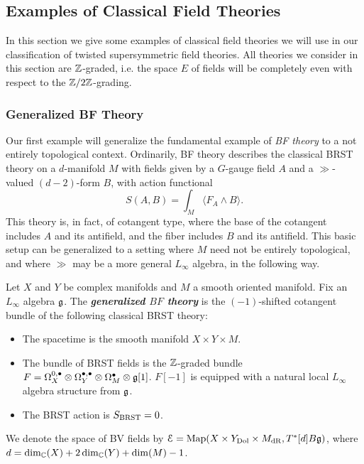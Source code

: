 \documentclass[10pt, oneside]{article}
\newcommand{\defterm}[1]{\textbf{\emph{#1}}}
\begin{document}
\subsection{Examples of Classical Field Theories}

In this section we give some examples of classical field theories we will use in our classification of twisted supersymmetric field theories. All theories we consider in this section are $\mathbb Z$-graded, i.e. the space $E$ of fields will be completely even with respect to the $\mathbb Z/2\mathbb Z$-grading.

\subsubsection{Generalized BF Theory} \label{gen_BF_section}

Our first example will generalize the fundamental example of \emph{BF theory} to a not entirely topological context.  Ordinarily, BF theory describes the classical BRST theory on a $d$-manifold $M$ with fields given by a $G$-gauge field $A$ and a $\gg$-valued $(d-2)$-form $B$, with action functional
\[S(A,B) = \int_M \langle F_A \wedge B \rangle.\]
This theory is, in fact, of cotangent type, where the base of the cotangent includes $A$ and its antifield, and the fiber includes $B$ and its antifield.  This basic setup can be generalized to a setting where $M$ need not be entirely topological, and where $\gg$ may be a more general $L_\infty$ algebra, in the following way.

\begin{definition}
Let $X$ and $Y$ be complex manifolds and $M$ a smooth oriented manifold. Fix an $L_\infty$ algebra $\mathfrak g$. The \defterm{generalized $BF$ theory} is the $(-1)$-shifted cotangent bundle of the following classical BRST theory:
\begin{itemize}
\item The spacetime is the smooth manifold $X\times Y\times M$.

\item The bundle of BRST fields is the $\mathbb Z$-graded bundle $F = \Omega^{0,\bullet}_X \otimes \Omega^{\bullet,\bullet}_Y \otimes \Omega^\bullet_M \otimes \mathfrak g[1]$. $F[-1]$ is equipped with a natural local $L_\infty$ algebra structure from $\mathfrak g$.

\item The BRST action is $S_{\mathrm{BRST}} = 0$.
\end{itemize}
We denote the space of BV fields by $\mathcal E = \operatorname{Map}(X\times Y_{\mathrm{Dol}}\times M_{\mathrm{dR}}, T^*[d] B\mathfrak g)$, where $d = \dim_\mathbb C(X) + 2\dim_\mathbb C(Y) + \dim(M) - 1$.
\label{def:generalizedBF}
\end{definition}
\end{document}

